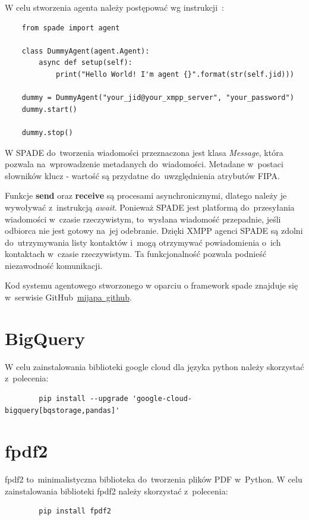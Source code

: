\documentclass[11pt]{report}
\begin{document}
    W celu stworzenia agenta należy postępować wg instrukcji~\cite{SPADEquickstart}:
    \begin{verbatim}
    from spade import agent

    class DummyAgent(agent.Agent):
        async def setup(self):
            print("Hello World! I'm agent {}".format(str(self.jid)))

    dummy = DummyAgent("your_jid@your_xmpp_server", "your_password")
    dummy.start()

    dummy.stop()
    \end{verbatim}

    W SPADE do~tworzenia wiadomości przeznaczona jest klasa \textit{Message},
    która pozwala na~wprowadzenie metadanych do~wiadomości.
    Metadane w~postaci słowników klucz - wartość są przydatne do~uwzględnienia atrybutów FIPA\@.

    Funkcje \textbf{send} oraz \textbf{receive} są procesami asynchronicznymi, dlatego należy je wywoływać z~instrukcją \textit{await}.
    Ponieważ SPADE jest platformą do~przesyłania wiadomości w~czasie rzeczywistym,
    to~wysłana wiadomość przepadnie, jeśli odbiorca nie jest gotowy na~jej odebranie.
    Dzięki XMPP agenci SPADE są zdolni do~utrzymywania listy kontaktów i~mogą otrzymywać powiadomienia o~ich kontaktach w~czasie rzeczywistym.
    Ta funkcjonalność pozwala podnieść niezawodność komunikacji.

    Kod systemu agentowego stworzonego w oparciu o framework spade znajduje się w~serwisie GitHub~\href{https://github.com/mijapa/Praca_dyplomowa}{mijapa~github}.


    \section{BigQuery}
    W celu zainstalowania biblioteki google cloud dla języka python należy skorzystać z~polecenia:
    \begin{verbatim}
        pip install --upgrade 'google-cloud-bigquery[bqstorage,pandas]'
    \end{verbatim}


    \section{fpdf2}
    fpdf2 to~minimalistyczna biblioteka do~tworzenia plików PDF w~Python.
    W celu zainstalowania biblioteki fpdf2 należy skorzystać z~polecenia:
    \begin{verbatim}
        pip install fpdf2
    \end{verbatim}
\end{document}
